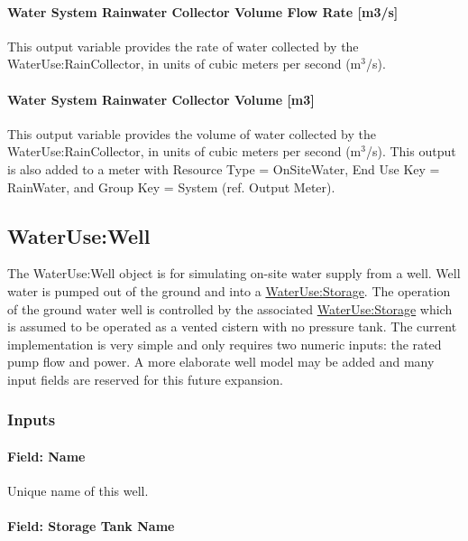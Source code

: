 \paragraph{Water System Rainwater Collector Volume Flow Rate {[}m3/s{]}}\label{water-system-rainwater-collector-volume-flow-rate-m3s}

This output variable provides the rate of water collected by the WaterUse:RainCollector, in units of cubic meters per second (m\(^{3}\)/s).

\paragraph{Water System Rainwater Collector Volume {[}m3{]}}\label{water-system-rainwater-collector-volume-m3}

This output variable provides the volume of water collected by the WaterUse:RainCollector, in units of cubic meters per second (m\(^{3}\)/s). This output is also added to a meter with Resource Type = OnSiteWater, End Use Key = RainWater, and Group Key = System (ref. Output Meter).

\subsection{WaterUse:Well}\label{waterusewell}

The WaterUse:Well object is for simulating on-site water supply from a well. Well water is pumped out of the ground and into a \hyperref[waterusestorage]{WaterUse:Storage}. The operation of the ground water well is controlled by the associated \hyperref[waterusestorage]{WaterUse:Storage} which is assumed to be operated as a vented cistern with no pressure tank. The current implementation is very simple and only requires two numeric inputs: the rated pump flow and power. A more elaborate well model may be added and many input fields are reserved for this future expansion.

\subsubsection{Inputs}\label{inputs-4-038}

\paragraph{Field: Name}\label{field-name-4-033}

Unique name of this well.

\paragraph{Field: Storage Tank Name}\label{field-storage-tank-name-1}

